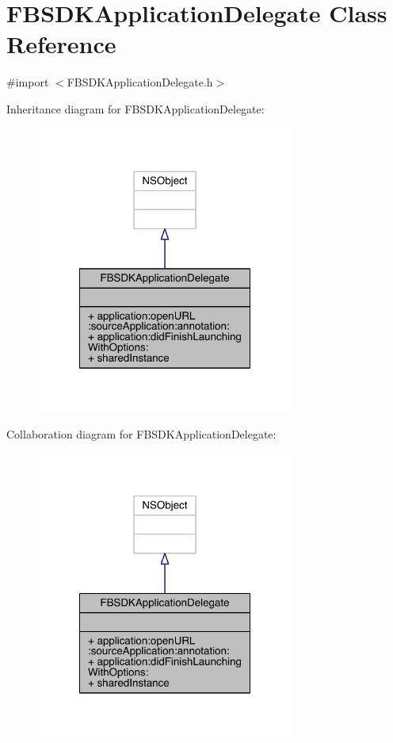\hypertarget{interface_f_b_s_d_k_application_delegate}{\section{F\-B\-S\-D\-K\-Application\-Delegate Class Reference}
\label{interface_f_b_s_d_k_application_delegate}
}


{\ttfamily \#import $<$F\-B\-S\-D\-K\-Application\-Delegate.\-h$>$}



Inheritance diagram for F\-B\-S\-D\-K\-Application\-Delegate\-:
\nopagebreak
\begin{figure}[H]
\begin{center}
\leavevmode
\includegraphics[width=240pt]{interface_f_b_s_d_k_application_delegate__inherit__graph}
\end{center}
\end{figure}


Collaboration diagram for F\-B\-S\-D\-K\-Application\-Delegate\-:
\nopagebreak
\begin{figure}[H]
\begin{center}
\leavevmode
\includegraphics[width=240pt]{interface_f_b_s_d_k_application_delegate__coll__graph}
\end{center}
\end{figure}
